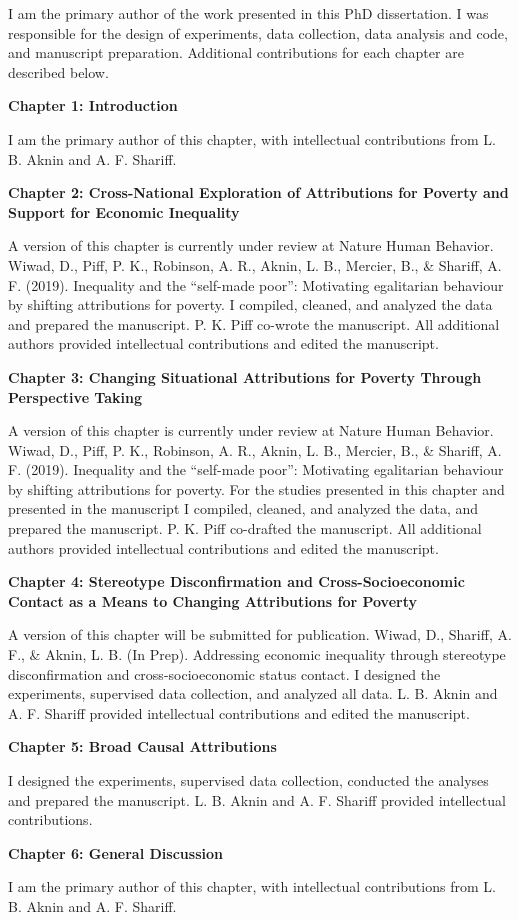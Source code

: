 \documentclass{sfuthesis}
\begin{document}
\begin{preface}
I am the primary author of the work presented in this PhD dissertation. I was responsible for the design of experiments, data collection, data analysis and code, and manuscript preparation. Additional contributions for each chapter are described below.
\begin{flushleft}
\textbf{Chapter 1: Introduction}
\end{flushleft}
I am the primary author of this chapter, with intellectual contributions from L. B. Aknin and A. F. Shariff.
\begin{flushleft}
\textbf{Chapter 2: Cross-National Exploration of Attributions for Poverty and Support for Economic Inequality}
\end{flushleft}
A version of this chapter is currently under review at Nature Human Behavior. Wiwad, D., Piff, P. K., Robinson, A. R., Aknin, L. B., Mercier, B., \& Shariff, A. F. (2019). Inequality and the “self-made poor”: Motivating egalitarian behaviour by shifting attributions for poverty. I compiled, cleaned, and analyzed the data and prepared the manuscript. P. K. Piff co-wrote the manuscript. All additional authors provided intellectual contributions and edited the manuscript. 
\begin{flushleft}
\textbf{Chapter 3: Changing Situational Attributions for Poverty Through Perspective Taking}
\end{flushleft}
A version of this chapter is currently under review at Nature Human Behavior. Wiwad, D., Piff, P. K., Robinson, A. R., Aknin, L. B., Mercier, B., \& Shariff, A. F. (2019). Inequality and the “self-made poor”: Motivating egalitarian behaviour by shifting attributions for poverty. For the studies presented in this chapter and presented in the manuscript I compiled, cleaned, and analyzed the data, and prepared the manuscript. P. K. Piff co-drafted the manuscript. All additional authors provided intellectual contributions and edited the manuscript. 
\begin{flushleft}
\textbf{Chapter 4: Stereotype Disconfirmation and Cross-Socioeconomic Contact as a Means to Changing Attributions for Poverty}
\end{flushleft}
A version of this chapter will be submitted for publication. Wiwad, D., Shariff, A. F., \& Aknin, L. B. (In Prep). Addressing economic inequality through stereotype disconfirmation and cross-socioeconomic status contact. I designed the experiments, supervised data collection, and analyzed all data. L. B. Aknin and A. F. Shariff provided intellectual contributions and edited the manuscript.
\begin{flushleft}
\textbf{Chapter 5: Broad Causal Attributions}
\end{flushleft}
I designed the experiments, supervised data collection, conducted the analyses and prepared the manuscript. L. B. Aknin and A. F. Shariff provided intellectual contributions.
\begin{flushleft}
\textbf{Chapter 6: General Discussion}
\end{flushleft}
I am the primary author of this chapter, with intellectual contributions from L. B. Aknin and A. F. Shariff.
\end{preface}
\end{document}
